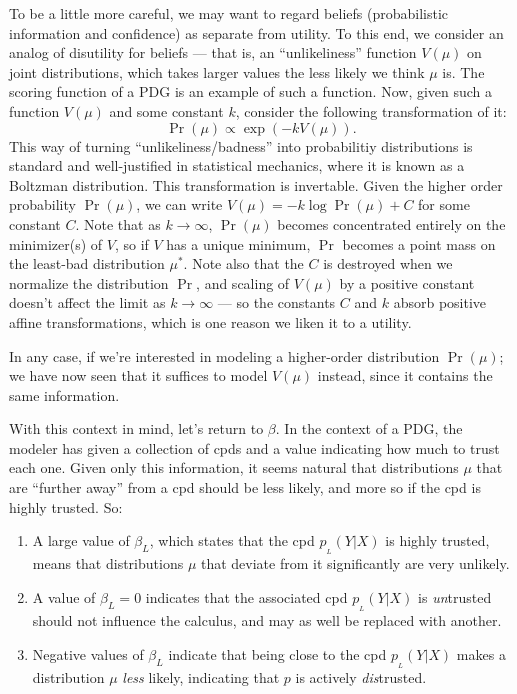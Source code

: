 \documentclass[twoside]{article} %
\theoremstyle{plain}
\theoremstyle{definition}
\newcommand{\ssub}[1]{_{\!_{#1}\!}}
\begin{document}
    To be a little more careful, we may want to regard beliefs (probabilistic information and confidence) as separate from utility.
    To this end, we consider an analog of disutility for beliefs --- that is, an ``unlikeliness'' function $V(\mu)$ on joint distributions, which takes larger values the less likely we think $\mu$ is. The scoring function of a PDG is an example of such a function.
    Now, given such a function $V(\mu)$ and some constant $k$, consider the following transformation of it:
    \[ \Pr(\mu) \propto \exp( -k V(\mu)).\]
    This way of turning ``unlikeliness/badness'' into probabilitiy distributions is standard and well-justified in statistical mechanics, where it is known as a Boltzman distribution.
    This transformation is invertable. Given the higher order probability $\Pr(\mu)$, we can write $V(\mu) = - k \log \Pr(\mu) + C$ for some constant $C$.  Note that as $k \to \infty$, $\Pr(\mu)$ becomes concentrated entirely on the minimizer(s) of $V$, so if $V$ has a unique minimum, $\Pr$ becomes a point mass on the least-bad distribution $\mu^*$. Note also that the $C$ is destroyed when we normalize the distribution $\Pr$, and scaling of $V(\mu)$ by a positive constant doesn't affect the limit as $k \to \infty$ --- so the constants $C$ and $k$ absorb positive affine transformations, which is one reason we liken it to a utility.

    In any case, if we're interested in modeling a higher-order distribution $\Pr(\mu)$; we have now seen that it suffices to model $V(\mu)$ instead, since it contains the same information.

    With this context in mind, let's return to $\beta$.
    In the context of a PDG, the modeler has given a collection of cpds and a value indicating how much to trust each one.
    Given only this information, it seems natural that distributions $\mu$ that are ``further away'' from a cpd should be less likely, and more so if the cpd is highly trusted. So:
    \begin{enumerate}
        \item A large value of $\beta_L$, which states that the cpd $p \ssub L(Y|X)$ is highly trusted, means that distributions $\mu$ that deviate from it significantly are very unlikely.
        \item A value of $\beta_L = 0$ indicates that the associated cpd $p\ssub L(Y|X)$ is \emph{un}trusted should not influence the calculus, and may as well be replaced with another.
        \item Negative values of $\beta_L$ indicate that being close to the cpd $p\ssub L(Y|X)$ makes a distribution $\mu$ \emph{less} likely, indicating that $p$ is actively \emph{dis}trusted.
    \end{enumerate}
\end{document}
